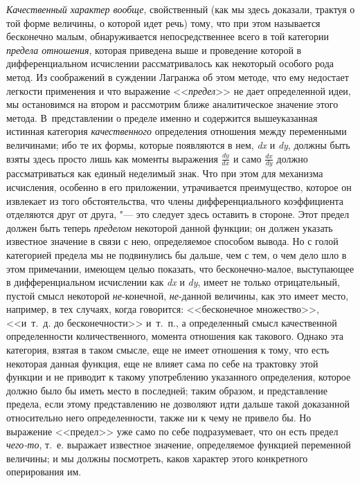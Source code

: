{\em Качественный характер вообще}, свойственный (как мы
здесь доказали, трактуя о той форме величины, о которой идет речь) тому,
что при этом называется бесконечно малым, обнаруживается непосредственнее
всего в той категории {\em предела отношения}, которая
приведена выше и проведение которой в дифференциальном исчислении
рассматривалось как некоторый особого рода метод. Из соображений в суждении
Лагранжа об этом методе, что ему недостает легкости применения и что
выражение <<{\em предел}>> не дает определенной идеи, мы
остановимся на втором и рассмотрим ближе аналитическое значение этого
метода. В~представлении о пределе именно и содержится вышеуказанная
истинная категория {\em качественного} определения
отношения между переменными величинами; ибо те их формы, которые появляются
в нем, {\em dx} и {\em dy}, должны
быть взяты здесь просто лишь как моменты выражения
$\frac{dy}{dx}$ и само
$\frac{dx}{dy}$ должно рассматриваться как единый
неделимый знак. Что при этом для механизма исчисления, особенно в его
приложении, утрачивается преимущество, которое он извлекает из того
обстоятельства, что члены дифференциального коэффициента отделяются друг от
друга, "--- это следует здесь оставить в стороне. Этот предел должен быть
теперь {\em пределом} некоторой данной функции; он
должен указать известное значение в связи с нею, определяемое способом
вывода. Но с голой категорией предела мы не подвинулись бы дальше, чем с
тем, о чем дело шло в этом примечании, имеющем целью показать, что
бесконечно-малое, выступающее в дифференциальном исчислении как
{\em dx} и {\em dy}, имеет не только отрицательный, пустой смысл некоторой
{\em не}-конечной, {\em не}-данной величины, как это имеет место,
например, в тех случаях, когда говорится: <<бесконечное множество>>, <<и~т.~д.
до бесконечности>> и~т.~п., а определенный смысл качественной определенности
количественного, момента отношения как такового. Однако эта категория,
взятая в таком смысле, еще не имеет отношения к тому, что есть некоторая
данная функция, еще не влияет сама по себе на трактовку этой функции и не
приводит к такому употреблению указанного определения, которое должно было
бы иметь место в последней; таким образом, и представление предела, если
этому представлению не дозволяют идти дальше такой доказанной относительно
него определенности, также ни к чему не привело бы. Но выражение <<предел>>
уже само по себе подразумевает, что он есть предел
{\em чего-то}, т.~е. выражает известное значение,
определяемое функцией переменной величины; и мы должны посмотреть, каков
характер этого конкретного оперирования им.


